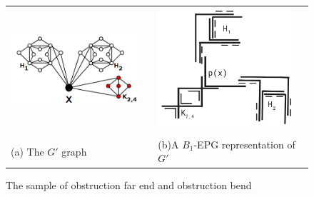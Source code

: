 \begin{figure}[h]
  \centering
  \begin{tabular}{p{5cm} p{1cm} p{5cm}}
     \includegraphics[width=5cm, center]{./img/grafoDobraExtremidadeObstruida.png} & &\includegraphics[width=5cm, center]{./img/extremidadeDobraObstruida.png}  \\%
    \footnotesize \centering (a) The $G'$ graph& & \footnotesize \centering (b)A $B_1$-EPG representation of $G'$%
  \end{tabular}
 \caption{The sample of obstruction far end and obstruction bend}\label{fig:extremidadeDobraObstruida}
\end{figure}